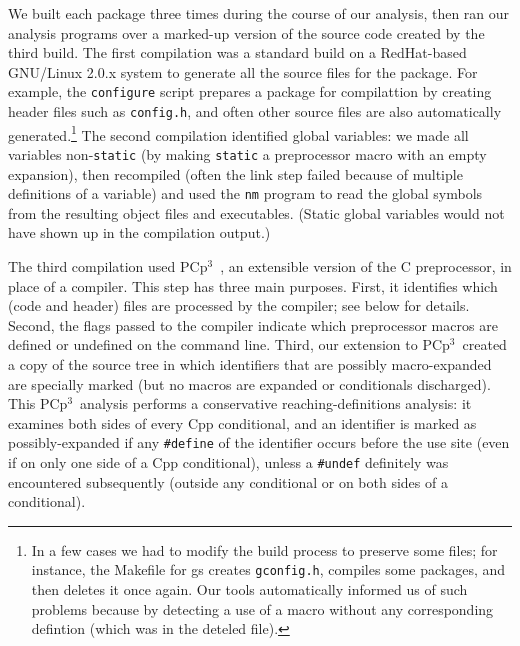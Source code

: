 \documentclass[10pt]{article}
\newcommand{\pcp}{\mbox{\textsf{PCp}$^3$}}
\newcommand{\pkg}[1]{\textsf{#1}}
\newcommand{\file}[1]{\texttt{#1}}
\newcommand{\ppd}[1]{\texttt{\##1}}
\begin{document}
We built each package three times during the course of our analysis, then
ran our analysis programs over a marked-up version of the source code
created by the third build.  The first compilation was a standard build on
a RedHat-based GNU/Linux 2.0.x system to generate all the source files for
the package.  For example, the {\tt configure} script prepares a package
for compilattion by creating header files such as \file{config.h}, and
often other source files are also automatically generated.\footnote{In a
  few cases we had to modify the build process to preserve some files; for
  instance, the Makefile for \pkg{gs} creates \file{gconfig.h}, compiles
  some packages, and then deletes it once again.  Our tools automatically
  informed us of such problems because by detecting a use of a macro
  without any corresponding defintion (which was in the deteled file).}
The second compilation identified global variables:  we made all variables
non-{\tt static} (by making {\tt static} a preprocessor macro with an empty
expansion), then recompiled (often the link step failed because of multiple
definitions of a variable) and used the {\tt nm} program to read the global
symbols from the resulting object files and executables.  (Static global
variables would not have shown up in the compilation output.)


The third compilation used \pcp{}~\cite{CppAwareCAnalyses}, an extensible
version of the C preprocessor, in place of a compiler.  This step has three
main purposes.  First, it identifies which (code and header) files are
processed by the compiler; see below for details.  Second, the flags passed
to the compiler indicate which preprocessor macros are defined or undefined
on the command line.  Third, our extension to \pcp\ created a copy of the
source tree in which identifiers that are possibly macro-expanded are
specially marked (but no macros are expanded or conditionals discharged).
This \pcp\ analysis performs a conservative reaching-definitions analysis:
it examines both sides of every Cpp conditional, and an identifier is
marked as possibly-expanded if any \ppd{define} of the identifier occurs
before the use site (even if on only one side of a Cpp conditional), unless
a \ppd{undef} definitely was encountered subsequently (outside any
conditional or on both sides of a conditional).
\end{document}
